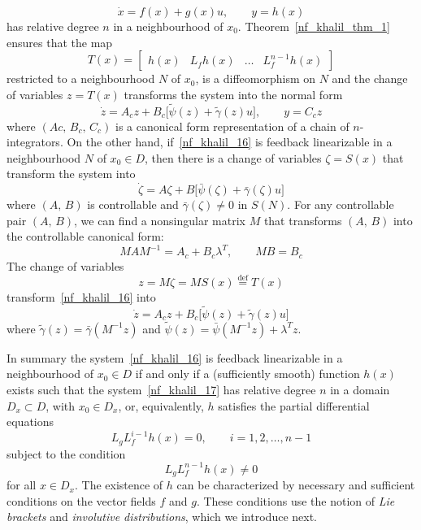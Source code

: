 \documentclass[11pt,a4paper,oneside]{book}
\numberwithin{equation}{section}
\theoremstyle{it}
\theoremstyle{definition}
\begin{document}
 \begin{equation}\label{nf_khalil_17}
 	\dot{x}=f(x)+g(x)u,\qquad y=h(x)
 \end{equation}
has relative degree $n$ in a neighbourhood of $x_0$. Theorem~\ref{nf_khalil_thm_1} ensures that the map 
\begin{equation*}
	T(x)=\begin{bmatrix} h(x) & L_fh(x) & \dots & L_f^{n-1}h(x)	\end{bmatrix}
\end{equation*}
restricted to a neighbourhood $N$ of $x_0$, is a diffeomorphism on $N$ and the change of variables $z=T(x)$ transforms the system into the normal form
\begin{equation*}
	\dot{z}=A_cz+B_c\Big[\tilde{\psi}(z) + \tilde{\gamma}(z)u\Big],\qquad y=C_cz
\end{equation*}
where $(Ac,\,B_c,\,C_c)$ is a canonical form representation of a chain of $n$-integrators. On the other hand, if~\eqref{nf_khalil_16} is feedback linearizable in a neighbourhood $N$ of $x_0\in D$, then there is a change of variables $\zeta=S(x)$ that transform the system into 
\begin{equation*}
	\dot{\zeta}=A\zeta+B\Big[\bar{\psi}(\zeta)+\bar{\gamma}(\zeta)u\Big]
\end{equation*}
where $(A,\,B)$ is controllable and $\bar{\gamma}(\zeta)\ne0$ in $S(N)$. For any controllable pair $(A,\,B)$, we can find a nonsingular matrix $M$ that transforms $(A,\,B)$ into the controllable canonical form:
\begin{equation*}
	MAM^{-1}=A_c+B_c\lambda^T,\qquad MB=B_c
\end{equation*}
The change of variables 
\begin{equation*}
	z=M\zeta=MS(x)\stackrel{\text{def}}{=}T(x)
\end{equation*}
transform~\eqref{nf_khalil_16} into
\begin{equation*}
	\dot{z} = A_cz+B_c\Big[\tilde{\psi}(z)+\tilde{\gamma}(z)u\Big]
\end{equation*}
where $\tilde{\gamma}(z)=\bar{\gamma}(M^{-1}z)$ and $\tilde{\psi}(z)=\bar{\psi}(M^{-1}z)+\lambda^Tz$.

In summary the system~\eqref{nf_khalil_16} is feedback linearizable in a 
neighbourhood of $x_0\in D$ if and only if a (sufficiently smooth) function 
$h(x)$ exists such that the system~\eqref{nf_khalil_17} has relative degree $n$ 
in a domain $D_x\subset D$, with $x_0\in D_x$, or, equivalently, $h$ satisfies 
the partial differential equations
\begin{equation}\label{nf_khalil_18}
	L_gL_f^{i-1}h(x) = 0,\qquad i=1,2,\dots,n-1
\end{equation} 
subject to the condition
\begin{equation}\label{nf_khalil_19}
	L_gL_f^{n-1}h(x) \ne 0
\end{equation} 
for all $x\in D_x$. The existence of $h$ can be characterized by necessary and 
sufficient conditions on the vector fields $f$ and $g$. These conditions use 
the notion of \textit{Lie brackets} and \textit{involutive distributions}, 
which we introduce next.
\end{document}

